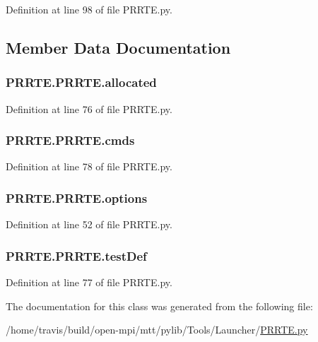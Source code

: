 Definition at line 98 of file P\-R\-R\-T\-E.\-py.



\subsection{Member Data Documentation}
\hypertarget{class_p_r_r_t_e_1_1_p_r_r_t_e_aa61e5452cb21084ebe29fddecf96b63e}{
\subsubsection[{allocated}]{\setlength{\rightskip}{0pt plus 5cm}P\-R\-R\-T\-E.\-P\-R\-R\-T\-E.\-allocated}}\label{class_p_r_r_t_e_1_1_p_r_r_t_e_aa61e5452cb21084ebe29fddecf96b63e}


Definition at line 76 of file P\-R\-R\-T\-E.\-py.

\hypertarget{class_p_r_r_t_e_1_1_p_r_r_t_e_ac33721f4ed5d701613528962b88e16e3}{
\subsubsection[{cmds}]{\setlength{\rightskip}{0pt plus 5cm}P\-R\-R\-T\-E.\-P\-R\-R\-T\-E.\-cmds}}\label{class_p_r_r_t_e_1_1_p_r_r_t_e_ac33721f4ed5d701613528962b88e16e3}


Definition at line 78 of file P\-R\-R\-T\-E.\-py.

\hypertarget{class_p_r_r_t_e_1_1_p_r_r_t_e_a174321352f6234d4704b9a980574bdc7}{
\subsubsection[{options}]{\setlength{\rightskip}{0pt plus 5cm}P\-R\-R\-T\-E.\-P\-R\-R\-T\-E.\-options}}\label{class_p_r_r_t_e_1_1_p_r_r_t_e_a174321352f6234d4704b9a980574bdc7}


Definition at line 52 of file P\-R\-R\-T\-E.\-py.

\hypertarget{class_p_r_r_t_e_1_1_p_r_r_t_e_a797f27c656051565b7897358a7c28a40}{
\subsubsection[{test\-Def}]{\setlength{\rightskip}{0pt plus 5cm}P\-R\-R\-T\-E.\-P\-R\-R\-T\-E.\-test\-Def}}\label{class_p_r_r_t_e_1_1_p_r_r_t_e_a797f27c656051565b7897358a7c28a40}


Definition at line 77 of file P\-R\-R\-T\-E.\-py.



The documentation for this class was generated from the following file\-:\begin{DoxyCompactItemize}
\item 
/home/travis/build/open-\/mpi/mtt/pylib/\-Tools/\-Launcher/\hyperlink{_p_r_r_t_e_8py}{P\-R\-R\-T\-E.\-py}\end{DoxyCompactItemize}
